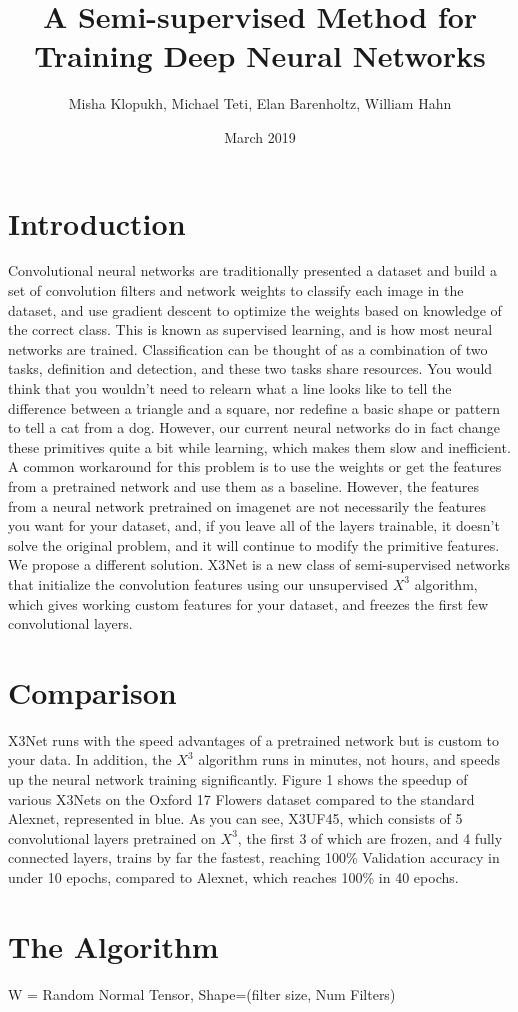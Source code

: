 \documentclass{article}
\title{A Semi-supervised Method for Training Deep Neural Networks}
\author{Misha Klopukh, Michael Teti, Elan Barenholtz, William Hahn}
\date{March 2019}
\begin{document}
\maketitle

\section{Introduction}
Convolutional neural networks are traditionally presented a dataset and build a set of convolution filters and network weights to classify each image in the dataset, and use gradient descent to optimize the weights based on knowledge of the correct class. This is known as supervised learning, and is how most neural networks are trained. Classification can be thought of as a combination of two tasks, definition and detection, and these two tasks share resources. You would think that you wouldn't need to relearn what a line looks like to tell the difference between a triangle and a square, nor redefine a basic shape or pattern to tell a cat from a dog. However, our current neural networks do in fact change these primitives quite a bit while learning, which makes them slow and inefficient. A common workaround for this problem is to use the weights or get the features from a pretrained network and use them as a baseline. However, the features from a neural network pretrained on imagenet are not necessarily the features you want for your dataset, and, if you leave all of the layers trainable, it doesn't solve the original problem, and it will continue to modify the primitive features. We propose a different solution. X3Net is a new class of semi-supervised networks that initialize the convolution features using our unsupervised $X^3$ algorithm, which gives working custom features for your dataset, and freezes the first few convolutional layers.
\section{Comparison}
X3Net runs with the speed advantages of a pretrained network but is custom to your data. In addition, the $X^3$ algorithm runs in minutes, not hours, and speeds up the neural network training significantly. Figure 1 shows the speedup of various X3Nets on the Oxford 17 Flowers dataset compared to the standard Alexnet, represented in blue. As you can see, X3UF45, which consists of 5 convolutional layers pretrained on $X^3$, the first 3 of which are frozen, and 4 fully connected layers, trains by far the fastest, reaching 100\% Validation accuracy in under 10 epochs, compared to Alexnet, which reaches 100\% in 40 epochs.
\section{The Algorithm}
\begin{algorithm}[H]
\SetAlgoLined
{}
W = Random Normal Tensor, Shape=(filter size, Num Filters)\;
\caption{$X^3$}
\end{algorithm}
\end{document}
